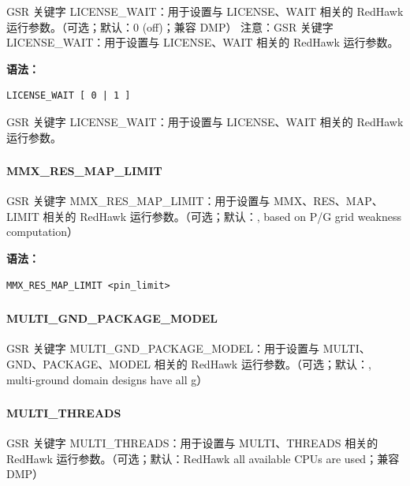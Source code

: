 GSR 关键字 LICENSE_WAIT：用于设置与 LICENSE、WAIT 相关的 RedHawk 运行参数。（可选；默认：0 (off)；兼容 DMP） 注意：GSR 关键字 LICENSE_WAIT：用于设置与 LICENSE、WAIT 相关的 RedHawk 运行参数。

\textbf{语法：}
\begin{lstlisting}
LICENSE_WAIT [ 0 | 1 ]
\end{lstlisting}

\begin{noteBox}
GSR 关键字 LICENSE\_WAIT：用于设置与 LICENSE、WAIT 相关的 RedHawk 运行参数。
\end{noteBox}

\subsubsection{}
\paragraph*{MMX_RES_MAP_LIMIT}

GSR 关键字 MMX_RES_MAP_LIMIT：用于设置与 MMX、RES、MAP、LIMIT 相关的 RedHawk 运行参数。（可选；默认：, based on P/G grid weakness computation）

\textbf{语法：}
\begin{lstlisting}
MMX_RES_MAP_LIMIT <pin_limit>
\end{lstlisting}

\subsubsection{}
\paragraph*{MULTI_GND_PACKAGE_MODEL}

GSR 关键字 MULTI_GND_PACKAGE_MODEL：用于设置与 MULTI、GND、PACKAGE、MODEL 相关的 RedHawk 运行参数。（可选；默认：, multi-ground domain designs have all g）

\subsubsection{}
\paragraph*{MULTI_THREADS}

GSR 关键字 MULTI_THREADS：用于设置与 MULTI、THREADS 相关的 RedHawk 运行参数。（可选；默认：RedHawk all available CPUs are used；兼容 DMP）

